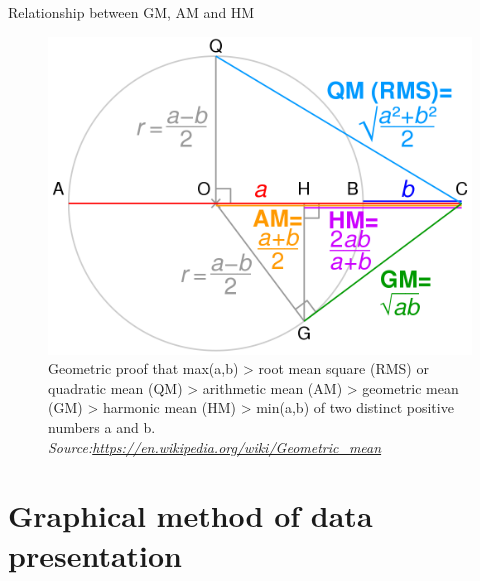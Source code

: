 \documentclass[
  ignorenonframetext,
  aspectratio=169]{beamer}
\begin{document}
\begin{frame}{Relationship between GM, AM and HM}
\protect\hypertarget{relationship-between-gm-am-and-hm}{}
\begin{figure}
\includegraphics[width=0.45\linewidth]{./images/geometric_proof_hm_am_gm} \caption{Geometric proof that max(a,b) > root mean square (RMS) or quadratic mean (QM) > arithmetic mean (AM) > geometric mean (GM) > harmonic mean (HM) > min(a,b) of two distinct positive numbers a and b. \textit{Source:\url{https://en.wikipedia.org/wiki/Geometric_mean}}}\label{fig:inequality-relation-gm-am-hm}
\end{figure}
\end{frame}

\hypertarget{graphical-method-of-data-presentation}{%
\section{Graphical method of data
presentation}\label{graphical-method-of-data-presentation}}
\end{document}
